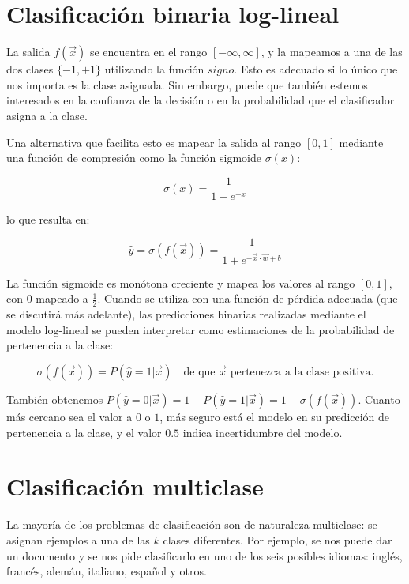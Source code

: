 \section{Clasificación binaria log-lineal}
La salida $f(\vec{x})$ se encuentra en el rango $[-\infty,\infty]$, y la mapeamos a una de las dos clases $\{-1,+1\}$ utilizando la función $signo$. Esto es adecuado si lo único que nos importa es la clase asignada. Sin embargo, puede que también estemos interesados en la confianza de la decisión o en la probabilidad que el clasificador asigna a la clase.

Una alternativa que facilita esto es mapear la salida al rango $[0,1]$ mediante una función de compresión como la función sigmoide $\sigma(x)$:

\begin{equation}
\sigma(x) = \frac{1}{1+e^{-x}}
\end{equation}

lo que resulta en:

\begin{equation}
\hat{y}=\sigma(f(\vec{x})) = \frac{1}{1+e^{-\vec{x}\cdot \vec{w}+b}}
\end{equation}

La función sigmoide es monótona creciente y mapea los valores al rango $[0, 1]$, con $0$ mapeado a $\frac{1}{2}$. Cuando se utiliza con una función de pérdida adecuada (que se discutirá más adelante), las predicciones binarias realizadas mediante el modelo log-lineal se pueden interpretar como estimaciones de la probabilidad de pertenencia a la clase:

\begin{equation}
 \sigma(f(\vec{x})) = P(\hat{y} = 1| \vec{x}) \quad \text{de que $\vec{x}$ pertenezca a la clase positiva.}
\end{equation}

También obtenemos $P(\hat{y} = 0| \vec{x}) = 1 - P(\hat{y} = 1| \vec{x}) = 1-\sigma(f(\vec{x}))$. Cuanto más cercano sea el valor a $0$ o $1$, más seguro está el modelo en su predicción de pertenencia a la clase, y el valor $0.5$ indica incertidumbre del modelo.

\section{Clasificación multiclase}
La mayoría de los problemas de clasificación son de naturaleza multiclase: se asignan ejemplos a una de las $k$ clases diferentes. Por ejemplo, se nos puede dar un documento y se nos pide clasificarlo en uno de los seis posibles idiomas: inglés, francés, alemán, italiano, español y otros.

